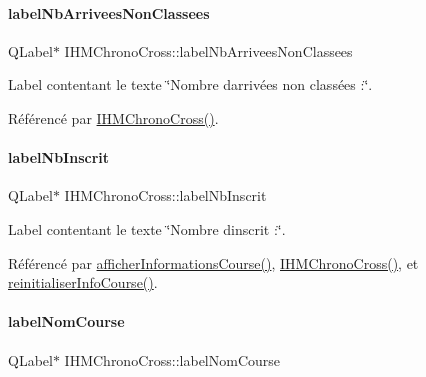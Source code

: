 \paragraph{\texorpdfstring{label\+Nb\+Arrivees\+Non\+Classees}{labelNbArriveesNonClassees}}
{\footnotesize\ttfamily Q\+Label$\ast$ I\+H\+M\+Chrono\+Cross\+::label\+Nb\+Arrivees\+Non\+Classees\hspace{0.3cm}{\ttfamily [private]}}



Label contentant le texte \char`\"{}\+Nombre d\textquotesingle{}arrivées non classées \+:\char`\"{}. 



Référencé par \hyperlink{class_i_h_m_chrono_cross_a479fc90733fba3e65fb06aa4a3adc02e}{I\+H\+M\+Chrono\+Cross()}.

\mbox{\label{class_i_h_m_chrono_cross_a9d410e8bc161481a83298176b2702519}} 
\paragraph{\texorpdfstring{label\+Nb\+Inscrit}{labelNbInscrit}}
{\footnotesize\ttfamily Q\+Label$\ast$ I\+H\+M\+Chrono\+Cross\+::label\+Nb\+Inscrit\hspace{0.3cm}{\ttfamily [private]}}



Label contentant le texte \char`\"{}\+Nombre d\textquotesingle{}inscrit \+:\char`\"{}. 



Référencé par \hyperlink{class_i_h_m_chrono_cross_afe18e84e4df15c15921f2bdcfc6f4396}{afficher\+Informations\+Course()}, \hyperlink{class_i_h_m_chrono_cross_a479fc90733fba3e65fb06aa4a3adc02e}{I\+H\+M\+Chrono\+Cross()}, et \hyperlink{class_i_h_m_chrono_cross_a1149f4f57c8cf34048f93fba6b4176b3}{reinitialiser\+Info\+Course()}.

\mbox{\label{class_i_h_m_chrono_cross_aebe86f4e614f568db5558bf99f1b44e6}} 
\paragraph{\texorpdfstring{label\+Nom\+Course}{labelNomCourse}}
{\footnotesize\ttfamily Q\+Label$\ast$ I\+H\+M\+Chrono\+Cross\+::label\+Nom\+Course\hspace{0.3cm}{\ttfamily [private]}}



